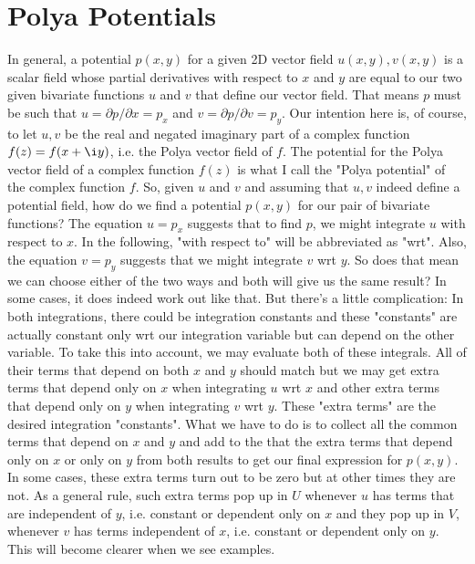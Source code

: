 \documentclass[12pt]{article}
\begin{document}
\section{Polya Potentials}
In general, a potential $p(x,y)$ for a given 2D vector field $u(x,y), v(x,y)$ is a scalar field whose partial derivatives with respect to $x$ and $y$ are equal to our two given bivariate functions $u$ and $v$ that define our vector field. That means $p$ must be such that $u = \partial p / \partial x = p_x$ and $v = \partial p / \partial v = p_y$. Our intention here is, of course, to let $u,v$ be the real and negated imaginary part of a complex function $f(z) = f(x + \i y)$, i.e. the Polya vector field of $f$. The potential for the Polya vector field of a complex function $f(z)$ is what I call the "Polya potential" of the complex function $f$. So, given $u$ and $v$ and assuming that $u,v$ indeed define a potential field, how do we find a potential $p(x,y)$ for our pair of bivariate functions? The equation $u = p_x$ suggests that to  find $p$, we might integrate $u$ with respect to $x$. In the following, "with respect to" will be abbreviated as "wrt". Also, the equation $v = p_y$ suggests that we might integrate $v$ wrt $y$. So does that mean we can choose either of the two ways and both will give us the same result? In some cases, it does indeed work out like that. But there's a little complication: In both integrations, there could be integration constants and these "constants" are actually constant only wrt our integration variable but can depend on the other variable. To take this into account, we may evaluate both of these integrals. All of their terms that depend on both $x$ and $y$ should match but we may get extra terms that depend only on $x$ when integrating $u$ wrt $x$ and other extra terms that depend only on $y$ when integrating $v$ wrt $y$. These "extra terms" are the desired integration "constants". What we have to do is to collect all the common terms that depend on $x$ and $y$ and add to the that the extra terms that depend only on $x$ or only on $y$ from both results to get our final expression for $p(x,y)$. In some cases, these extra terms turn out to be zero but at other times they are not. As a general rule, such extra terms pop up in $U$ whenever $u$ has terms that are independent of $y$, i.e. constant or dependent only on $x$ and they pop up in $V$, whenever $v$ has terms independent of $x$, i.e. constant or dependent only on $y$. This will become clearer when we see examples.
\end{document}
